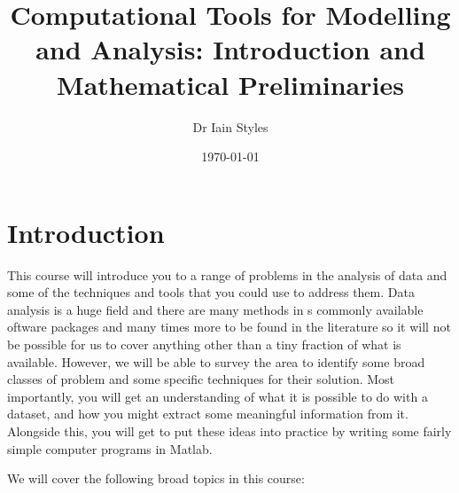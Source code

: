 \documentclass[12pt,a4paper]{tufte-handout}
\title{Computational Tools for Modelling and Analysis: Introduction and Mathematical Preliminaries}
\author{Dr Iain Styles}
\date{\today}
\begin{document}
\maketitle
\section{Introduction}

This course will introduce you to a range of problems in the analysis of data and some of the techniques and tools that you could use to address them. Data analysis is a huge field and there are many methods in s commonly available oftware packages and many times more to be found in the literature so it will not be possible for us to cover anything other than a tiny fraction of what is available. However, we will be able to survey the area to identify some broad classes of problem and some specific techniques for their solution. Most importantly, you will get an understanding of what it is possible to do with a dataset, and how you might extract some meaningful information from it. Alongside this, you will get to put these ideas into practice by writing some fairly simple computer programs in Matlab.

We will cover the following broad topics in this course:
\end{document}

